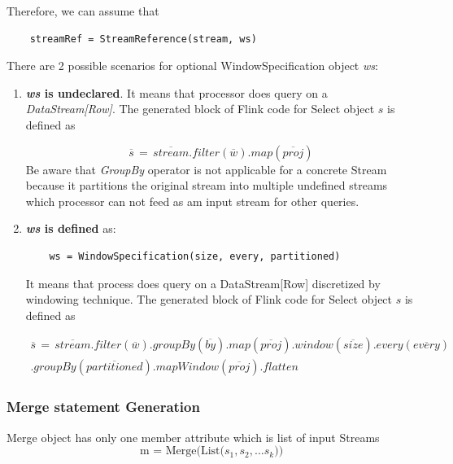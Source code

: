 Therefore, we can assume that
\begin{lstlisting}
	streamRef = StreamReference(stream, ws)
\end{lstlisting}



There are 2 possible scenarios for optional WindowSpecification object \textit{ws}:
\begin{enumerate}
	\item \textbf{\textit{ws} is undeclared}. It means that processor does query on a \textit{DataStream[Row]}.  The generated block of Flink code for Select object $s$ is defined as
	
	\begin{equation}
	\overline{s}\, =\,\overline{stream} .filter(\overline{w}).map(\overline{proj})
\end{equation}
	Be aware that \textit{GroupBy} operator is not applicable for a concrete Stream because it partitions the original stream into multiple undefined streams which processor can not feed as am input stream for other queries. 
	
	\item \textbf{\textit{ws} is defined} as:
		\begin{lstlisting} 
	ws = WindowSpecification(size, every, partitioned)
\end{lstlisting}
It means that process does query on a DataStream[Row] discretized by windowing technique. The generated block of Flink code for Select object $s$ is defined as


\begin{multline}
	\overline{s}\, =\,\overline{stream} .filter(\overline{w}).groupBy(\overline{by}).map(\overline{proj})	.window(\overline{size}).every(\overline{every}) \\
	.groupBy(\overline{partitioned}).mapWindow(\overline{proj}).flatten
\end{multline} 


	
\end{enumerate}


\subsubsection*{Merge statement Generation}

Merge object has only one member attribute which is list of input Streams
\begin{equation}
	\textrm{m = Merge(List(} s_1, s_2, ...s_k \textrm{))}
\end{equation}

